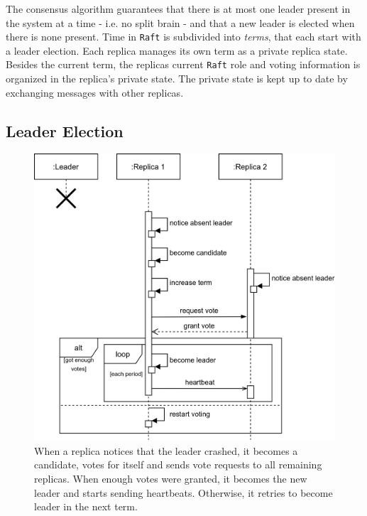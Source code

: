 The consensus algorithm guarantees that there is at most one leader present in the system at a time - i.e. no split brain - and that a new leader is elected when there is none present.
Time in \texttt{Raft} is subdivided into \textit{terms}, that each start with a leader election.
Each replica manages its own term as a private replica state.
Besides the current term, the replicas current \texttt{Raft} role and voting information is organized in the replica's private state.
The private state is kept up to date by exchanging messages with other replicas.

\subsection{Leader Election}
\begin{figure}[!hb]
	\centering
	\includegraphics[width=0.75\linewidth]{images/sequence/LeaderElection}
	\caption{When a replica notices that the leader crashed, it becomes a candidate, votes for itself and sends vote requests to all remaining replicas. When enough votes were granted, it becomes the new leader and starts sending heartbeats. Otherwise, it retries to become leader in the next term.}
	\label{fig:SeqLeaderElection}
\end{figure}

